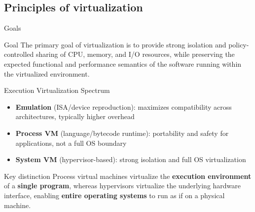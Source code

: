 \subsection{Principles of virtualization}

\begin{frame}{Goals}
  \vspace{0.4em}
  \begin{block}{Goal}
    The primary goal of virtualization is to provide
    strong isolation and policy-controlled
    sharing of CPU, memory, and I/O resources,
    while preserving the expected functional and performance
    semantics of the software running within the
    virtualized environment.
  \end{block}
\end{frame}

\begin{frame}{Execution Virtualization Spectrum}
  \begin{itemize}
    \item \textbf{Emulation} (ISA/device reproduction): maximizes compatibility across architectures, typically higher overhead
    \item \textbf{Process VM} (language/bytecode runtime): portability and safety for applications, not a full OS boundary
    \item \textbf{System VM} (hypervisor-based): strong isolation and full OS virtualization
  \end{itemize}
  \vspace{0.4em}
  \begin{block}{Key distinction}
    Process virtual machines virtualize the \textbf{execution environment}
    of a \textbf{single program}, whereas hypervisors virtualize the underlying
    hardware interface, enabling \textbf{entire operating systems} to run as if
    on a physical machine.
  \end{block}
\end{frame}

